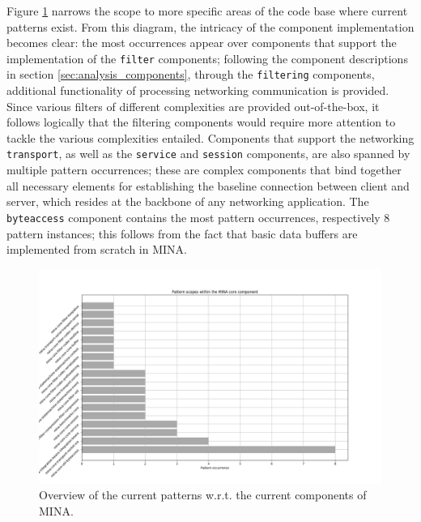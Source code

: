Figure \ref{fig:mina_core_scope} narrows the scope to more specific areas of the code base where current patterns exist. From this diagram, the intricacy of the component implementation becomes clear: the most occurrences appear over components that support the implementation of the \texttt{filter} components; following the component descriptions in section \ref{sec:analysis_components}, through the \texttt{filtering} components,  additional functionality of processing networking communication is provided. Since various filters of different complexities are provided out-of-the-box, it follows logically that the filtering components would require more attention to tackle the various complexities entailed. Components that support the networking \texttt{transport}, as well as the \texttt{service} and \texttt{session} components, are also spanned by multiple pattern occurrences; these are complex components that bind together all necessary elements for establishing the baseline connection between client and server, which resides at the backbone of any networking application. The \texttt{byteaccess} component contains the most pattern occurrences, respectively 8 pattern instances; this follows from the fact that basic data buffers are implemented from scratch in MINA.

\begin{landscape}
\begin{figure}
    \centering
    \includegraphics[scale = 0.6]{images/graphs/core_scopes.png}
    \caption{Overview of the current patterns w.r.t. the current components of MINA.}
    \label{fig:mina_core_scope}
\end{figure}
\end{landscape}

